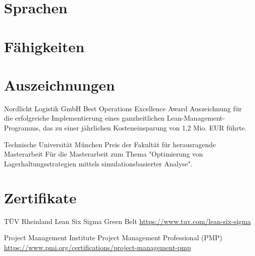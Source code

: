 \documentclass[a4paper, serif, 10pt]{moderncv}
\begin{document}
\section{Sprachen}

\section{Fähigkeiten}

\section{Auszeichnungen}

        {Nordlicht Logistik GmbH}
        {Best Operations Excellence Award}
        {}
        {}
        {Auszeichnung für die erfolgreiche Implementierung eines ganzheitlichen Lean-Management-Programms, das zu einer jährlichen Kosteneinsparung von 1,2 Mio. EUR führte.}

        {Technische Universität München}
        {Preis der Fakultät für herausragende Masterarbeit}
        {}
        {}
        {Für die Masterarbeit zum Thema "Optimierung von Lagerhaltungsstrategien mittels simulationsbasierter Analyse".}
\section{Zertifikate}

        {TÜV Rheinland}
        {Lean Six Sigma Green Belt}
        {\url{https://www.tuv.com/lean-six-sigma}}
        {}
        {}

        {Project Management Institute}
        {Project Management Professional (PMP)}
        {\url{https://www.pmi.org/certifications/project-management-pmp}}
        {}
        {}
\end{document}
